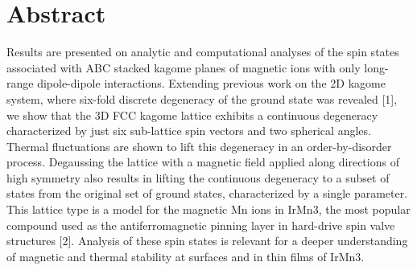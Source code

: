 \doublespacing
\setlength{\topmargin}{-.5in}
\chapter*{Abstract}





Results are presented on analytic and computational analyses of the spin states associated with ABC stacked
kagome planes of magnetic ions with only long-range dipole-dipole interactions. Extending previous work on
the 2D kagome system, where six-fold discrete degeneracy of the ground state was revealed [1], we show that
the 3D FCC kagome lattice exhibits a continuous degeneracy characterized by just six sub-lattice spin vectors
and two spherical angles. Thermal fluctuations are shown to lift this degeneracy in an order-by-disorder
process. Degaussing the lattice with a magnetic field applied along directions of high symmetry also results
in lifting the continuous degeneracy to a subset of states from the original set of ground states, characterized by a single parameter. This lattice type is a model for the magnetic Mn ions in IrMn3, the most popular compound used as the antiferromagnetic pinning layer in hard-drive spin valve structures [2]. Analysis of these spin states is relevant for a deeper understanding of magnetic and thermal stability at surfaces and in thin films of IrMn3.


